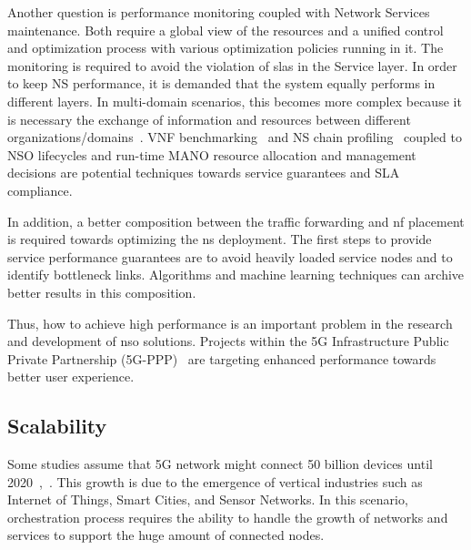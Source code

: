 
Another question is performance monitoring coupled with Network Services maintenance. Both require a global view of the resources and a unified control and optimization process with various optimization policies running in it. The monitoring is required to avoid the violation of \glspl{sla} in the Service layer. In order to keep NS performance, it is demanded that the system equally performs in different layers. In multi-domain scenarios, this becomes more complex because it is necessary the exchange of information and resources between different organizations/domains~\cite{md2}. 
VNF benchmarking~\cite{7313620} and NS chain profiling~\cite{7956044} coupled to NSO lifecycles and run-time MANO resource allocation and management decisions are potential techniques towards service guarantees and SLA compliance.  

In addition, a better composition between the traffic forwarding and \gls{nf} placement is required towards optimizing the \gls{ns} deployment. The first steps to provide service performance guarantees are to avoid heavily loaded service nodes and to identify bottleneck links. Algorithms and machine learning techniques can archive better results in this composition.   

Thus, how to achieve high performance is an important problem in the research and development of \gls{nso} solutions. Projects within the 5G Infrastructure Public Private Partnership (5G-PPP)~\cite{elayoubi:hal-01488208} are targeting enhanced performance towards better user experience. 



\subsection{Scalability}

Some studies assume that 5G network might connect 50 billion devices until 2020~\cite{Panwar2016ACommunication},~\cite{Evans2011TheEverything}. This growth is due to the emergence of vertical industries such as Internet of Things, Smart Cities, and Sensor Networks. In this scenario, orchestration process requires the ability to handle the growth of networks and services to support the huge amount of connected nodes.

